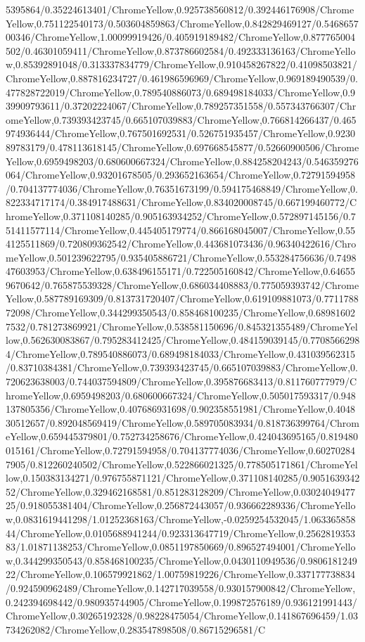{\begin{tikzternal}
5395864/0.35224613401/ChromeYellow,0.925738560812/0.392446176908/ChromeYellow,0.751122540173/0.503604859863/ChromeYellow,0.842829469127/0.546865700346/ChromeYellow,1.00099919426/0.405919189482/ChromeYellow,0.877765004502/0.46301059411/ChromeYellow,0.873786602584/0.492333136163/ChromeYellow,0.85392891048/0.313337834779/ChromeYellow,0.910458267822/0.41098503821/ChromeYellow,0.887816234727/0.461986596969/ChromeYellow,0.969189490539/0.477828722019/ChromeYellow,0.789540886073/0.689498184033/ChromeYellow,0.939909793611/0.37202224067/ChromeYellow,0.789257351558/0.557343766307/ChromeYellow,0.739393423745/0.665107039883/ChromeYellow,0.766814266437/0.465974936444/ChromeYellow,0.767501692531/0.526751935457/ChromeYellow,0.923089783179/0.478113618145/ChromeYellow,0.697668545877/0.52660900506/ChromeYellow,0.6959498203/0.680600667324/ChromeYellow,0.884258204243/0.546359276064/ChromeYellow,0.93201678505/0.293652163654/ChromeYellow,0.72791594958/0.704137774036/ChromeYellow,0.76351673199/0.594175468849/ChromeYellow,0.822334717174/0.384917488631/ChromeYellow,0.834020008745/0.667199460772/ChromeYellow,0.371108140285/0.905163934252/ChromeYellow,0.572897145156/0.751411577114/ChromeYellow,0.445405179774/0.866168045007/ChromeYellow,0.554125511869/0.720809362542/ChromeYellow,0.443681073436/0.96340422616/ChromeYellow,0.501239622795/0.935405886721/ChromeYellow,0.553284756636/0.749847603953/ChromeYellow,0.638496155171/0.722505160842/ChromeYellow,0.646559670642/0.765875539328/ChromeYellow,0.686034408883/0.775059393742/ChromeYellow,0.587789169309/0.813731720407/ChromeYellow,0.619109881073/0.771178872098/ChromeYellow,0.344299350543/0.858468100235/ChromeYellow,0.689816027532/0.781273869921/ChromeYellow,0.538581150696/0.845321355489/ChromeYellow,0.562630083867/0.795283412425/ChromeYellow,0.484159039145/0.77085662984/ChromeYellow,0.789540886073/0.689498184033/ChromeYellow,0.431039562315/0.83710384381/ChromeYellow,0.739393423745/0.665107039883/ChromeYellow,0.720623638003/0.744037594809/ChromeYellow,0.395876683413/0.811760777979/ChromeYellow,0.6959498203/0.680600667324/ChromeYellow,0.505017593317/0.948137805356/ChromeYellow,0.407686931698/0.902358551981/ChromeYellow,0.404830512657/0.892048569419/ChromeYellow,0.589705083934/0.818736399764/ChromeYellow,0.659445379801/0.752734258676/ChromeYellow,0.424043695165/0.819480015161/ChromeYellow,0.72791594958/0.704137774036/ChromeYellow,0.602702847905/0.812260240502/ChromeYellow,0.522866021325/0.778505171861/ChromeYellow,0.150383134271/0.976755871121/ChromeYellow,0.371108140285/0.905163934252/ChromeYellow,0.329462168581/0.851283128209/ChromeYellow,0.0302404947725/0.918055381404/ChromeYellow,0.256872443057/0.936662289336/ChromeYellow,0.0831619441298/1.01252368163/ChromeYellow,-0.0259254532045/1.06336585844/ChromeYellow,0.0105688941244/0.923313647719/ChromeYellow,0.256281935383/1.01871138253/ChromeYellow,0.0851197850669/0.896527494001/ChromeYellow,0.344299350543/0.858468100235/ChromeYellow,0.0430110949536/0.980618124922/ChromeYellow,0.106579921862/1.00759819226/ChromeYellow,0.337177738834/0.924590962489/ChromeYellow,0.142717039558/0.930157900842/ChromeYellow,0.242394698442/0.980935744905/ChromeYellow,0.199872576189/0.936121991443/ChromeYellow,0.30265192328/0.98228475054/ChromeYellow,0.141867696459/1.03734262082/ChromeYellow,0.283547898508/0.86715296581/C
\end{tikzternal}}
